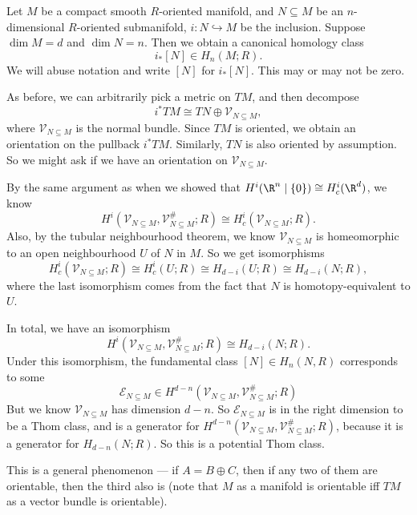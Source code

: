 \documentclass[a4paper]{article}
\begin{document}
Let $M$ be a compact smooth $R$-oriented manifold, and $N \subseteq M$ be an $n$-dimensional $R$-oriented submanifold, $i: N \hookrightarrow M$ be the inclusion. Suppose $\dim M = d$ and $\dim N = n$. Then we obtain a canonical homology class
\[
  i_*[N] \in H_n(M; R).
\]
We will abuse notation and write $[N]$ for $i_* [N]$. This may or may not be zero.

As before, we can arbitrarily pick a metric on $TM$, and then decompose
\[
  i^*TM \cong TN \oplus \mathcal{V}_{N \subseteq M},
\]
where $\mathcal{V}_{N\subseteq M}$ is the normal bundle. Since $TM$ is oriented, we obtain an orientation on the pullback $i^*TM$. Similarly, $TN$ is also oriented by assumption. So we might ask if we have an orientation on $\mathcal{V}_{N \subseteq M}$.

By the same argument as when we showed that $H^i(\R^n \mid \{0\}) \cong H_c^i(\R^d)$, we know
\[
  H^i(\mathcal{V}_{N \subseteq M}, \mathcal{V}_{N \subseteq M}^\#; R) \cong H_c^i(\mathcal{V}_{N \subseteq M}; R).
\]
Also, by the tubular neighbourhood theorem, we know $\mathcal{V}_{N \subseteq M}$ is homeomorphic to an open neighbourhood $U$ of $N$ in $M$. So we get isomorphisms
\[
  H^i_c(\mathcal{V}_{N \subseteq M}; R) \cong H_c^i(U; R) \cong H_{d - i}(U; R) \cong H_{d - i}(N; R),
\]
where the last isomorphism comes from the fact that $N$ is homotopy-equivalent to $U$.

In total, we have an isomorphism
\[
  H^i(\mathcal{V}_{N \subseteq M}, \mathcal{V}_{N \subseteq M}^\#; R) \cong H_{d - i}(N; R).
\]
Under this isomorphism, the fundamental class $[N] \in H_n(N, R)$ corresponds to some
\[
  \mathcal{E}_{N \subseteq M} \in H^{d - n}(\mathcal{V}_{N \subseteq M}, \mathcal{V}_{N \subseteq M}^\#; R)
\]
But we know $\mathcal{V}_{N \subseteq M}$ has dimension $d - n$. So $\mathcal{E}_{N \subseteq M}$ is in the right dimension to be a Thom class, and is a generator for $H^{d - n}(\mathcal{V}_{N \subseteq M}, \mathcal{V}_{N \subseteq M}^\#; R)$, because it is a generator for $H_{d - n}(N; R)$. So this is a potential Thom class.

This is a general phenomenon --- if $A = B \oplus C$, then if any two of them are orientable, then the third also is (note that $M$ as a manifold is orientable iff $TM$ as a vector bundle is orientable).
\end{document}
